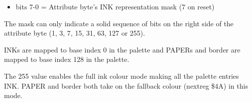 \begin{itemize}
\item bits 7-0 = Attribute byte's INK representation mask (7 on reset)
\end{itemize}
The mask can only indicate a solid sequence of bits on the right side
of the attribute byte (1, 3, 7, 15, 31, 63, 127 or 255).

INKs are mapped to base index 0 in the palette and PAPERs and border
are mapped to base index 128 in the palette.

The 255 value enables the full ink colour mode making all the palette
entries INK. PAPER and border both take on the fallback colour
(nextreg \$4A) in this mode.

